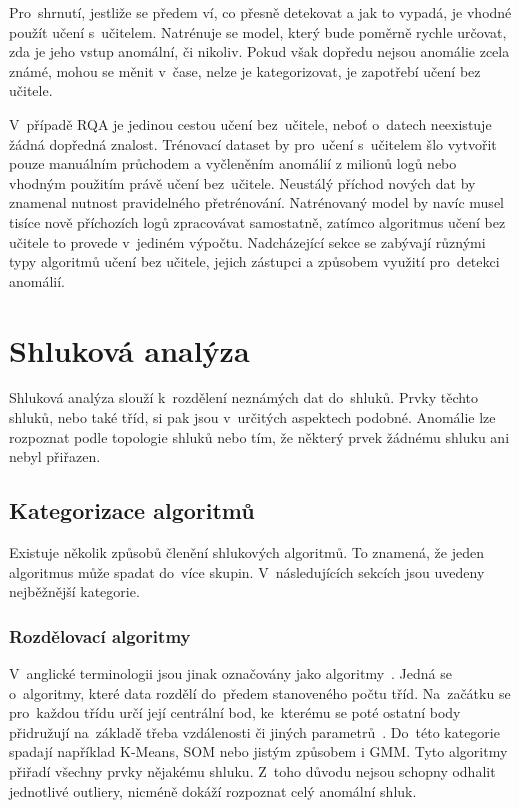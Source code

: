 Pro~shrnutí, jestliže se předem ví, co přesně detekovat a jak to vypadá, je vhodné použít učení s~učitelem. Natrénuje se model, který bude poměrně rychle určovat, zda je jeho vstup anomální, či nikoliv. Pokud však dopředu nejsou anomálie zcela známé, mohou se měnit v~čase, nelze je kategorizovat, je zapotřebí učení bez učitele.

V~případě RQA je jedinou cestou učení bez~učitele, neboť o~datech neexistuje žádná dopředná znalost. Trénovací dataset by pro~učení s~učitelem šlo vytvořit pouze manuálním průchodem a vyčleněním anomálií z milionů logů nebo vhodným použitím právě učení bez~učitele. Neustálý příchod nových dat by znamenal nutnost pravidelného přetrénování. Natrénovaný model by navíc musel tisíce nově příchozích logů zpracovávat samostatně, zatímco algoritmus učení bez učitele to provede v~jediném výpočtu. Nadcházející sekce se zabývají různými typy algoritmů učení bez učitele, jejich zástupci a způsobem využití pro~detekci anomálií.

\section{Shluková analýza}
Shluková analýza slouží k~rozdělení neznámých dat do~shluků. Prvky těchto shluků, nebo také tříd, si pak jsou v~určitých aspektech podobné. Anomálie lze rozpoznat podle topologie shluků nebo tím, že některý prvek žádnému shluku ani nebyl přiřazen.

\subsection{Kategorizace algoritmů}
Existuje několik způsobů členění shlukových algoritmů. To znamená, že jeden algoritmus může spadat do~více skupin. V~následujících sekcích jsou uvedeny nejběžnější kategorie.

\subsubsection{Rozdělovací algoritmy}
V~anglické terminologii jsou jinak označovány jako  algoritmy~\cite{cluster-methods-article}. Jedná se o~algoritmy, které data rozdělí do~předem stanoveného počtu tříd. Na~začátku se pro~každou třídu určí její centrální bod, ke~kterému se poté ostatní body přidružují na~základě třeba vzdálenosti či jiných parametrů~\cite{cluster-methods-article}. Do~této kategorie spadají například K-Means, SOM nebo jistým způsobem i GMM. Tyto algoritmy přiřadí všechny prvky nějakému shluku. Z~toho důvodu nejsou schopny odhalit jednotlivé outliery, nicméně dokáží rozpoznat celý anomální shluk.

